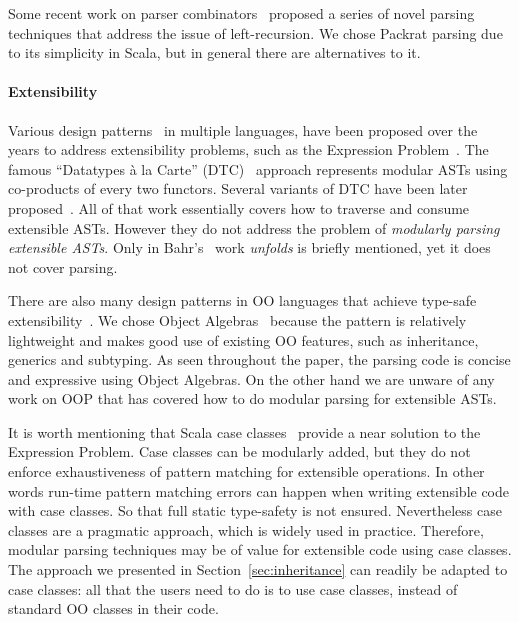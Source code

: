 Some recent work on parser
combinators~\cite{Ford2002,Might2011,Frost2008} proposed a series of
novel parsing techniques that address the issue of
left-recursion. We chose Packrat parsing due to its simplicity in Scala,
but in general there are alternatives to it.

\vspace{-5pt}
\paragraph{Extensibility} Various design patterns~\cite{gamma1995design} in multiple
languages, have been proposed over the years to address extensibility
problems, such as the Expression Problem~\cite{wadler1998expression}.
The famous ``Datatypes \`a
la Carte'' (DTC)~\cite{swierstra2008data} approach represents modular ASTs using co-products
of every two functors. Several variants of DTC have been later proposed~\cite{Bahr2011,Bahr2014,Oliveira2015}.
All of that work essentially covers how to traverse and
consume extensible ASTs. However they do not
address the problem of \emph{modularly
parsing extensible ASTs}. Only in Bahr's~\cite{Bahr2011} work \emph{unfolds} is briefly mentioned,
yet it does not cover parsing.

There are also many design patterns in OO languages that achieve
type-safe extensibility~\cite{torgersen2004expression,odersky2005independently,oliveira2009modular,Oliveira:2012,wang2016expression}. We chose Object Algebras~\cite{Oliveira:2012} because the pattern is
relatively lightweight and makes good use of existing OO features,
such as inheritance, generics and subtyping. As seen throughout the paper,
the parsing code is concise and expressive using Object Algebras.
On the other hand we are unware of any work on OOP
that has covered how to do modular parsing for extensible ASTs.

It is worth mentioning that Scala case classes~\cite{emir2007matching} provide a near
solution to the Expression Problem. Case classes can be
modularly added, but they do not enforce
exhaustiveness of pattern matching for extensible operations. In other
words run-time pattern matching errors can happen when writing extensible code with case classes. So that full static type-safety is not ensured. Nevertheless case classes are a pragmatic approach, which is
widely used in practice. Therefore, modular parsing techniques may be
of value for extensible code using case classes.  The approach we
presented in Section~\ref{sec:inheritance} can readily be adapted to case classes:
all that the users need to do is to use case classes, instead of
standard OO classes in their code.
\vspace{-7pt}


